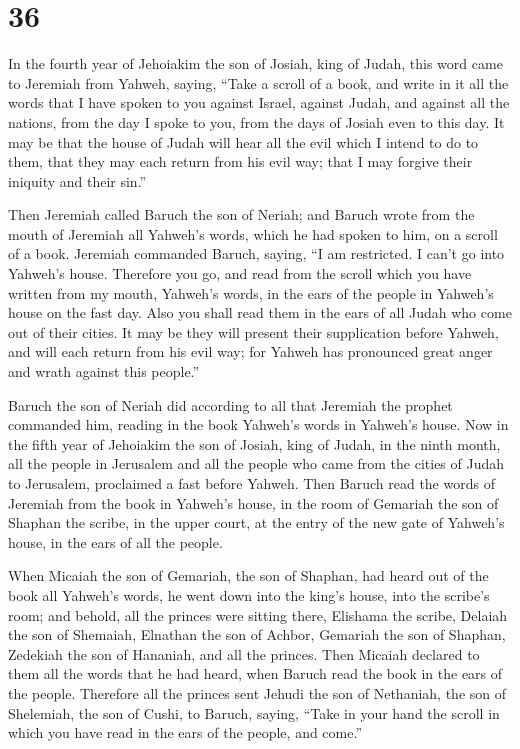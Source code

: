 \hypertarget{section-35}{%
\section{36}\label{section-35}}

 In the fourth year of Jehoiakim the son of Josiah, king of
Judah, this word came to Jeremiah from Yahweh, saying, 
``Take a scroll of a book, and write in it all the words that I have
spoken to you against Israel, against Judah, and against all the
nations, from the day I spoke to you, from the days of Josiah even to
this day.  It may be that the house of Judah will hear all
the evil which I intend to do to them, that they may each return from
his evil way; that I may forgive their iniquity and their sin.''

 Then Jeremiah called Baruch the son of Neriah; and Baruch
wrote from the mouth of Jeremiah all Yahweh's words, which he had spoken
to him, on a scroll of a book.  Jeremiah commanded Baruch,
saying, ``I am restricted. I can't go into Yahweh's house. 
Therefore you go, and read from the scroll which you have written from
my mouth, Yahweh's words, in the ears of the people in Yahweh's house on
the fast day. Also you shall read them in the ears of all Judah who come
out of their cities.  It may be they will present their
supplication before Yahweh, and will each return from his evil way; for
Yahweh has pronounced great anger and wrath against this people.''

 Baruch the son of Neriah did according to all that Jeremiah
the prophet commanded him, reading in the book Yahweh's words in
Yahweh's house.  Now in the fifth year of Jehoiakim the son
of Josiah, king of Judah, in the ninth month, all the people in
Jerusalem and all the people who came from the cities of Judah to
Jerusalem, proclaimed a fast before Yahweh.  Then Baruch
read the words of Jeremiah from the book in Yahweh's house, in the room
of Gemariah the son of Shaphan the scribe, in the upper court, at the
entry of the new gate of Yahweh's house, in the ears of all the people.

 When Micaiah the son of Gemariah, the son of Shaphan, had
heard out of the book all Yahweh's words,  he went down
into the king's house, into the scribe's room; and behold, all the
princes were sitting there, Elishama the scribe, Delaiah the son of
Shemaiah, Elnathan the son of Achbor, Gemariah the son of Shaphan,
Zedekiah the son of Hananiah, and all the princes.  Then
Micaiah declared to them all the words that he had heard, when Baruch
read the book in the ears of the people.  Therefore all the
princes sent Jehudi the son of Nethaniah, the son of Shelemiah, the son
of Cushi, to Baruch, saying, ``Take in your hand the scroll in which you
have read in the ears of the people, and come.''

